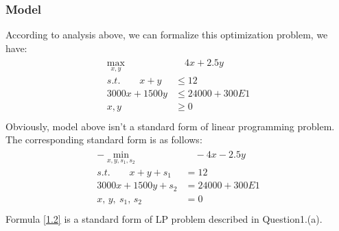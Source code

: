 \documentclass[titlepage,a4paper]{article}
\begin{document}
        \subsubsection{Model}
            According to analysis above, we can formalize  this optimization problem, we have:
            \begin{align}\label{1.1}
            \begin{split}  
                \max_{x,y} &\quad 4x + 2.5y \\
                s.t.\qquad x + y &\leq 12 \\
                3000x + 1500y &\leq 24000 + 300E1 \\
                x,y &\geq 0 \\
            \end{split}    
            \end{align}      
            Obviously, model above isn't a standard form of linear programming problem. The corresponding standard form is as follows:
            \begin{align}\label{1.2}
            \begin{split}  
                -\min_{x,y,s_1,s_2} &\quad -4x - 2.5y \\
                s.t.\qquad x + y + s_1 &= 12 \\
                3000x + 1500y +s_2 &= 24000 + 300E1 \\
                x,\,y,\:s_1,\,s_2 &= 0 \\
            \end{split}    
            \end{align}      
            Formula \eqref{1.2} is a standard form of LP problem described in Question1.(a).
\end{document}
